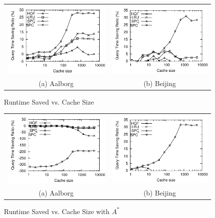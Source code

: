 \begin{figure}[htb]
\center
  \begin{tabular}{@{}c@{ }c@{}}
     \includegraphics[width=0.5\columnwidth]{figures/cachesize_diffruntime_aal.pdf}
     &
     \includegraphics[width=0.5\columnwidth]{figures/cachesize_diffruntime_bei.pdf}
      \\
     (a) Aalborg & (b)  Beijing
     \end{tabular}
\caption{Runtime Saved vs. Cache Size}
\label{fig:cacheSizeVsHitRuntime}
\end{figure}

\begin{figure}[htb]
\center
  \begin{tabular}{@{}c@{ }c@{}}
     \includegraphics[width=0.5\columnwidth]{figures/cachesize_diffruntime_aal_astar.pdf}
     &
     \includegraphics[width=0.5\columnwidth]{figures/cachesize_diffruntime_bei_astar.pdf}
      \\
     (a) Aalborg & (b)  Beijing
     \end{tabular}
\caption{Runtime Saved vs. Cache Size with $A^*$}
\label{fig:cacheSizeVsHitRuntime}
\end{figure}

